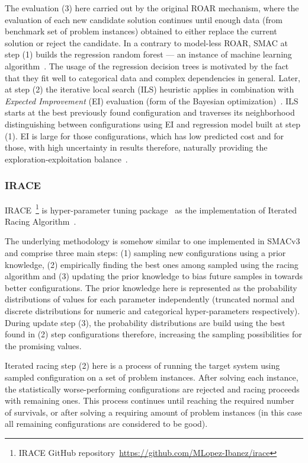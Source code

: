 The evaluation (3) here carried out by the original ROAR mechanism, where the evaluation of each new candidate solution continues until enough data (from benchmark set of problem instances) obtained to either replace the current solution or reject the candidate. In a contrary to model-less ROAR, SMAC at step (1) builds the regression random forest — an instance of machine learning algorithm~\cite{breiman2001random}. The usage of the regression decision trees is motivated by the fact that they fit well to categorical data and complex dependencies in general. Later, at step (2) the iterative local search (ILS) heuristic applies in combination with \emph{Expected Improvement} (EI) evaluation (form of the Bayesian optimization)~\cite{shahriari2015taking}. ILS starts at the best previously found configuration and traverses its neighborhood distinguishing between configurations using EI and regression model built at step (1). EI is large for those configurations, which has low predicted cost and for those, with high uncertainty in results therefore, naturally providing the exploration-exploitation balance~\cite{jones1998efficient}.


\subsubsection{IRACE}\label{bg: irace}
IRACE~\footnote{IRACE GitHub repository~\url{https://github.com/MLopez-Ibanez/irace}} is hyper-parameter tuning package~\cite{lopez2016irace} as the implementation of Iterated Racing Algorithm~\cite{birattari2010f}.

The underlying methodology is somehow similar to one implemented in SMACv3 and comprise three main steps: (1) sampling new configurations using a prior knowledge, (2) empirically finding the best ones among sampled using the racing algorithm and (3) updating the prior knowledge to bias future samples in towards better configurations. The prior knowledge here is represented as the probability distributions of values for each parameter independently (truncated normal and discrete distributions for numeric and categorical hyper-parameters respectively). During update step (3), the probability distributions are build using the best found in (2) step configurations therefore, increasing the sampling possibilities for the promising values.

Iterated racing step (2) here is a process of running the target system using sampled configuration on a set of problem instances. After solving each instance, the statistically worse-performing configurations are rejected and racing proceeds with remaining ones. This process continues until reaching the required number of survivals, or after solving a requiring amount of problem instances (in this case all remaining configurations are considered to be good). 

